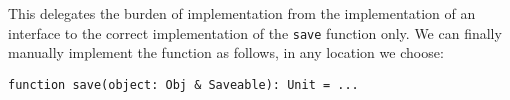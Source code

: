 This delegates the burden of implementation from the implementation of an interface to the correct implementation of the \texttt{save} function only. We can finally manually implement the function as follows, in any location we choose:

\begin{lstlisting}
function save(object: Obj & Saveable): Unit = ...
\end{lstlisting}





